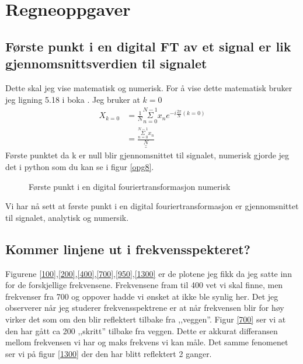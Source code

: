\documentclass[a4paper,12pt,norsk]{article}
\newcommand{\uu}{\underline}
\begin{document}
\section{Regneoppgaver}

\subsection{Første punkt i en digital FT av et signal er lik gjennomsnittsverdien til signalet}
Dette skal jeg vise matematisk og numerisk. For å vise dette matematisk bruker jeg ligning 5.18 i boka \cite{boka}. Jeg bruker at $k = 0$
\begin{align*}
X_{k=0} &= \frac{1}{N} \underset{n=0}{\overset{N-1}{\Sigma}}x_ne^{-i\frac{2\pi}{N}(k=0)}\\
&= \uu{\uu{\frac{ \underset{n=0}{\overset{N-1}{\Sigma}} x_n }{N}}}
\end{align*}
Første punktet da k er null blir gjennomsnittet til signalet, numerisk gjorde jeg det i python som du kan se i figur \vref{opg8}. 

\begin{figure}[h!]

\caption{Første punkt i en digital fouriertransformasjon numerisk}
\label{opg8}
\end{figure}
Vi har nå sett at første punkt i en digital fouriertransformasjon er gjennomsnittet til signalet, analytisk og numersik.

\subsection{Kommer linjene ut i frekvensspekteret?}

Figurene \ref{100},\ref{200},\ref{400},\ref{700},\ref{950},\vref{1300} er de plotene jeg fikk da jeg satte inn for de forskjellige frekvensene. Frekvensene fram til 400 vet vi skal finne, men frekvenser fra 700 og oppover hadde vi ønsket at ikke ble synlig her. Det jeg observerer når jeg studerer frekvensspektrene er at når frekvensen blir for høy virker det som om den blir reflektert tilbake fra ,,veggen''. Figur \vref{700} ser vi at den har gått ca 200 ,,skritt'' tilbake fra veggen. Dette er akkurat differansen mellom frekvensen vi har og maks frekvens vi kan måle. Det samme fenomenet ser vi på figur \vref{1300} der den har blitt reflektert 2 ganger. 
\end{document}
